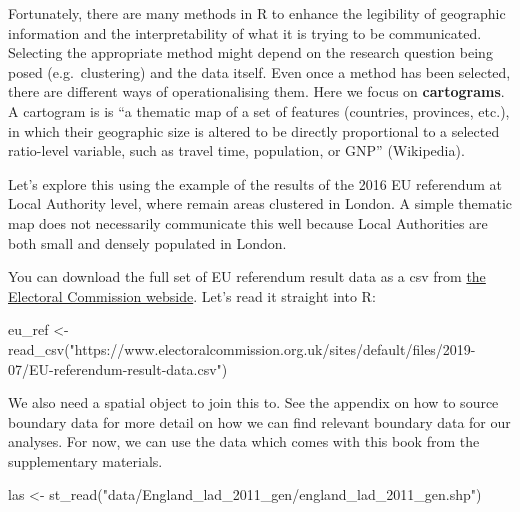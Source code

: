 \documentclass[
]{book}
\newenvironment{Shaded}{\begin{snugshade}}{\end{snugshade}}
\newcommand{\FunctionTok}[1]{\textcolor[rgb]{0.00,0.00,0.00}{#1}}
\newcommand{\NormalTok}[1]{#1}
\newcommand{\OtherTok}[1]{\textcolor[rgb]{0.56,0.35,0.01}{#1}}
\newcommand{\StringTok}[1]{\textcolor[rgb]{0.31,0.60,0.02}{#1}}
\begin{document}
Fortunately, there are many methods in R to enhance the legibility of geographic information and the interpretability of what it is trying to be communicated. Selecting the appropriate method might depend on the research question being posed (e.g.~clustering) and the data itself. Even once a method has been selected, there are different ways of operationalising them. Here we focus on \textbf{cartograms}. A cartogram is is ``a thematic map of a set of features (countries, provinces, etc.), in which their geographic size is altered to be directly proportional to a selected ratio-level variable, such as travel time, population, or GNP'' (Wikipedia).

Let's explore this using the example of the results of the 2016 EU referendum at Local Authority level, where remain areas clustered in London. A simple thematic map does not necessarily communicate this well because Local Authorities are both small and densely populated in London.

You can download the full set of EU referendum result data as a csv from \href{https://www.electoralcommission.org.uk/find-information-by-subject/elections-and-referendums/past-elections-and-referendums/eu-referendum/eu-referendum-result-visualisations}{the Electoral Commission webside}. Let's read it straight into R:

\begin{Shaded}
\begin{Highlighting}[]
\NormalTok{eu\_ref }\OtherTok{\textless{}{-}} \FunctionTok{read\_csv}\NormalTok{(}\StringTok{"https://www.electoralcommission.org.uk/sites/default/files/2019{-}07/EU{-}referendum{-}result{-}data.csv"}\NormalTok{)}
\end{Highlighting}
\end{Shaded}

We also need a spatial object to join this to. See the appendix on how to source boundary data for more detail on how we can find relevant boundary data for our analyses. For now, we can use the data which comes with this book from the supplementary materials.

\begin{Shaded}
\begin{Highlighting}[]
\NormalTok{las }\OtherTok{\textless{}{-}} \FunctionTok{st\_read}\NormalTok{(}\StringTok{"data/England\_lad\_2011\_gen/england\_lad\_2011\_gen.shp"}\NormalTok{)}
\end{Highlighting}
\end{Shaded}
\end{document}
